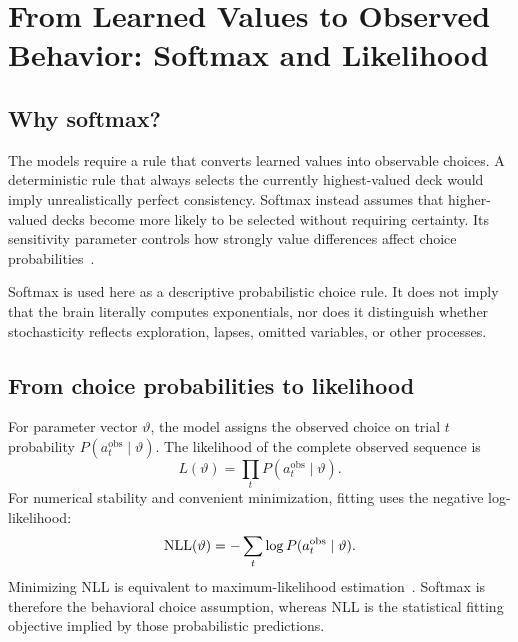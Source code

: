 \section{From Learned Values to Observed Behavior: Softmax and Likelihood}
\subsection{Why softmax?}

The models require a rule that converts learned values into observable choices. A deterministic rule that always selects the currently highest-valued deck would imply unrealistically perfect consistency. Softmax instead assumes that higher-valued decks become more likely to be selected without requiring certainty. Its sensitivity parameter controls how strongly value differences affect choice probabilities~\cite{daw2011}.

Softmax is used here as a descriptive probabilistic choice rule. It does not imply that the brain literally computes exponentials, nor does it distinguish whether stochasticity reflects exploration, lapses, omitted variables, or other processes.

\subsection{From choice probabilities to likelihood}

For parameter vector \(\vartheta\), the model assigns the observed choice on trial \(t\) probability \(P(a_t^{\mathrm{obs}}\mid\vartheta)\). The likelihood of the complete observed sequence is
\begin{equation}
L(\vartheta)=\prod_t P(a_t^{\mathrm{obs}}\mid\vartheta).
\end{equation}
For numerical stability and convenient minimization, fitting uses the negative log-likelihood:
\begin{equation}
\operatorname{NLL}(\vartheta)=-\sum_t\log P(a_t^{\mathrm{obs}}\mid\vartheta).
\end{equation}
Minimizing NLL is equivalent to maximum-likelihood estimation~\cite{daw2011}. Softmax is therefore the behavioral choice assumption, whereas NLL is the statistical fitting objective implied by those probabilistic predictions.
